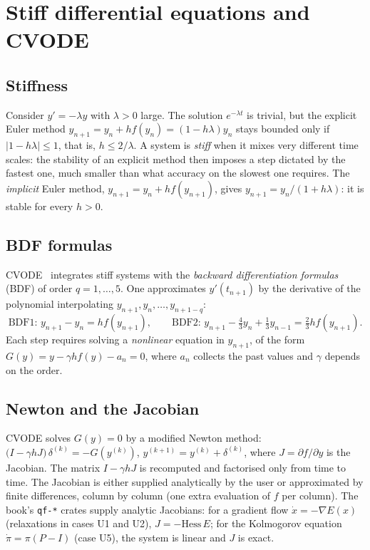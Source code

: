 \section{Stiff differential equations and CVODE}\label{appD:sec:cvode}

\subsection{Stiffness}
Consider $y'=-\lambda y$ with $\lambda>0$ large. The solution $e^{-\lambda t}$ is trivial, but the explicit Euler
method $y_{n+1}=y_n+hf(y_n)=(1-h\lambda)y_n$ stays bounded only if $|1-h\lambda|\le1$, that is, $h\le2/\lambda$. A system
is \emph{stiff} when it mixes very different time scales: the stability of an explicit method then imposes a step
dictated by the fastest one, much smaller than what accuracy on the slowest one requires. The \emph{implicit} Euler
method, $y_{n+1}=y_n+hf(y_{n+1})$, gives $y_{n+1}=y_n/(1+h\lambda)$: it is stable for every $h>0$.

\subsection{BDF formulas}
CVODE~\cite{app:sundials} integrates stiff systems with the \emph{backward differentiation formulas} (BDF) of order
$q=1,\dots,5$. One approximates $y'(t_{n+1})$ by the derivative of the polynomial interpolating
$y_{n+1},y_n,\dots,y_{n+1-q}$:
\[\text{BDF1: }y_{n+1}-y_n=hf(y_{n+1}),\qquad\text{BDF2: }y_{n+1}-\tfrac43y_n+\tfrac13y_{n-1}=\tfrac23hf(y_{n+1}).\]
Each step requires solving a \emph{nonlinear} equation in $y_{n+1}$, of the form $G(y)=y-\gamma hf(y)-a_n=0$, where
$a_n$ collects the past values and $\gamma$ depends on the order.

\subsection{Newton and the Jacobian}
CVODE solves $G(y)=0$ by a modified Newton method:
$\bigl(I-\gamma hJ\bigr)\,\delta^{(k)}=-G(y^{(k)})$, $y^{(k+1)}=y^{(k)}+\delta^{(k)}$, where $J=\partial f/\partial y$ is the
Jacobian. The matrix $I-\gamma hJ$ is recomputed and factorised only from time to time. The Jacobian is either supplied
analytically by the user or approximated by finite differences, column by column (one extra evaluation of $f$ per
column). The book's \texttt{qf-*} crates supply analytic Jacobians: for a gradient flow $\dot x=-\nabla E(x)$
(relaxations in cases U1 and U2), $J=-\mathrm{Hess}\,E$; for the Kolmogorov equation $\dot\pi=\pi(P-I)$ (case U5), the
system is linear and $J$ is exact.

